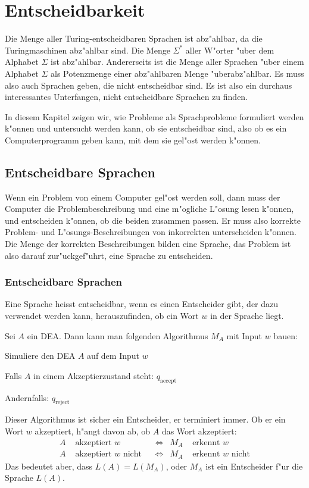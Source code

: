 % 
%
\chapter{Entscheidbarkeit\label{chapter-entscheidbarkeit}}
\rhead{}
Die Menge aller Turing-entscheidbaren Sprachen ist abz"ahlbar,
da die Turingmaschinen abz"ahlbar sind.
Die Menge $\Sigma^*$ aller W"orter "uber dem Alphabet $\Sigma$ ist abz"ahlbar.
Andererseits ist die Menge aller Sprachen "uber einem Alphabet $\Sigma$
als Potenzmenge einer abz"ahlbaren Menge "uberabz"ahlbar.
Es muss also auch Sprachen geben, die nicht entscheidbar sind.
Es ist also
ein durchaus interessantes Unterfangen, nicht entscheidbare Sprachen
zu finden.

In diesem Kapitel zeigen wir, wie Probleme als Sprachprobleme
formuliert werden k"onnen und untersucht werden kann, ob sie entscheidbar sind,
also ob es ein Computerprogramm geben kann, mit dem sie gel"ost werden
k"onnen.

\section{Entscheidbare Sprachen}
%
Wenn ein Problem von einem Computer gel"ost werden soll, dann
muss der Computer die Problembeschreibung und eine m"ogliche L"osung
lesen k"onnen, und entscheiden k"onnen, ob die beiden zusammen passen.
Er muss also korrekte Problem- und L"osungs-Beschreibungen von
inkorrekten unterscheiden k"onnen.
Die Menge der korrekten
Beschreibungen bilden eine Sprache, das Problem ist also darauf
zur"uckgef"uhrt, eine Sprache zu entscheiden.

\subsection{Entscheidbare Sprachen}
Eine Sprache heisst entscheidbar, wenn es einen Entscheider gibt, der
dazu verwendet werden kann, herauszufinden, ob ein Wort $w$ in der Sprache
liegt.

\begin{beispiel}
Sei $A$ ein DEA.
Dann kann man folgenden Algorithmus $M_A$ mit Input $w$ bauen:
\begin{compactenum}
\item Simuliere den DEA $A$ auf dem Input $w$
\item Falls $A$ in einem Akzeptierzustand steht: $q_{\text{accept}}$
\item Andernfalls: $q_{\text{reject}}$
\end{compactenum}
Dieser Algorithmus ist sicher ein Entscheider, er terminiert immer.
Ob er ein Wort $w$ akzeptiert, h"angt davon ab, ob $A$ das Wort akzeptiert:
\begin{align*}
  A&\text{ akzeptiert $w$}&
   &\Leftrightarrow&
M_A&\text{ erkennt $w$}
\\
  A&\text{ akzeptiert $w$ nicht}&
   &\Leftrightarrow&
M_A&\text{ erkennt $w$ nicht}
\end{align*}
Das bedeutet aber, dass $L(A)=L(M_A)$, oder $M_A$ ist ein Entscheider f"ur
die Sprache $L(A)$.
\end{beispiel}

